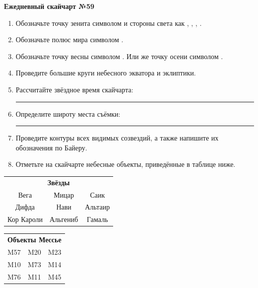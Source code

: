 \documentclass{./SAS-class-skygen}
\begin{document}
    
    
    
	\begin{center}
		\large\textbf{Ежедневный скайчарт №59}
	\end{center}

	\begin{enumerate}
		\item Обозначьте точку зенита символом  и стороны света как , , , .
		\item Обозначьте полюс мира символом .
		\item Обозначьте точку весны символом \Aries. Или же точку осени символом \Libra.
		\item Проведите большие круги небесного экватора и эклиптики.
		\item Рассчитайте звёздное время скайчарта: \rule{2cm}{0.4pt}
		\item Определите широту места съёмки: \rule{2cm}{0.4pt}
		\item Проведите контуры всех видимых созвездий, а также напишите их обозначения по Байеру.
		\item Отметьте на скайчарте небесные объекты, приведённые в таблице ниже.
	\end{enumerate}
	
    \vspace{0.5cm}

    \begin{table}[h!]
    \centering
    \begin{tabular}{ccc}
    \multicolumn{3}{c}{\textbf{Звёзды}} \\ Вега & Мицар & Саик \\
Дифда & Нави & Альтаир \\
Кор Кароли & Альгениб & Гамаль \\

\end{tabular}
    \hfill
    \begin{tabular}{ccc}
    \multicolumn{3}{c}{\textbf{Объекты Мессье}} \\ M57 & M20 & M23 \\
M10 & M73 & M14 \\
M76 & M11 & M45 \\

\end{tabular}
    \end{table}
	
\end{document}

